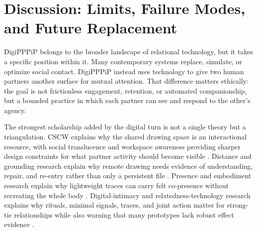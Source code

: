 \documentclass[
  english,
]{article}
\begin{document}
\newpage

\section{Discussion: Limits, Failure Modes, and Future
Replacement}\label{sec:discussion}

DigiPPPiP belongs to the broader landscape of relational technology, but
it takes a specific position within it. Many contemporary systems
replace, simulate, or optimize social contact. DigiPPPiP instead uses
technology to give two human partners another surface for mutual
attention. That difference matters ethically: the goal is not
frictionless engagement, retention, or automated companionship, but a
bounded practice in which each partner can see and respond to the
other's agency.

The strongest scholarship added by the digital turn is not a single
theory but a triangulation. CSCW explains why the shared drawing space
is an interactional resource, with social translucence and workspace
awareness providing sharper design constraints for what partner activity
should become visible
\citep{tang1991collaborativework, erickson2000socialtranslucence, gutwin2002workspaceawareness}.
Distance and grounding research explain why remote drawing needs
evidence of understanding, repair, and re-entry rather than only a
persistent file \citep{olson2000distance, clark1991grounding}. Presence
and embodiment research explain why lightweight traces can carry felt
co-presence without recreating the whole body
\citep{lombard1997presence, biocca1997cyborg, lee2004presence}.
Digital-intimacy and relatedness-technology research explains why
rituals, minimal signals, traces, and joint action matter for strong-tie
relationships while also warning that many prototypes lack robust effect
evidence
\citep{kaye2006clicked, hassenzahl2012love, neustaedter2012intimacy, vetere2005mediating, mcveighschultz2015couple, wenhart2025relatedness}.
\end{document}
